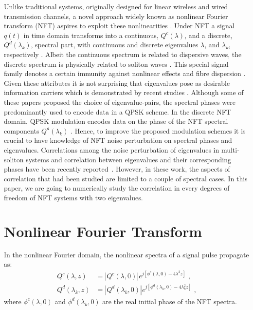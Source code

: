 \documentclass[9pt,twocolumn,twoside]{osajnl}
\begin{document}
Unlike traditional systems, originally designed for linear wireless and wired transmission channels, a novel approach widely known as nonlinear Fourier transform (NFT) aspires to exploit these nonlinearities \cite{Agrawal2006, derevyanko_capacity_2016, essiambre_capacity_2010}. Under NFT a signal $q(t)$ in time domain transforms into a continuous, $Q^c(\lambda)$, and a discrete, $Q^d(\lambda_k)$, spectral part, with continuous and discrete eigenvalues $\lambda$, and $\lambda_k$, respectively \cite{yousefi_information_2014}. Albeit the continuous spectrum is related to dispersive waves, the discrete spectrum is physically related to soliton waves \cite{yousefi_information_2014, yousefi_information_2014-1, Agrawal2006}. This special signal family denotes a certain immunity against nonlinear effects and fibre dispersion \cite{Agrawal2006, derevyanko_capacity_2016}. Given these attributes it is not surprising that eigenvalues pose as desirable information carriers which is demonstrated by recent studies \cite{bulow_experimental_2016, aref_experimental_2015, aref_demonstration_2016, gui_alternative_2017, gui_4_2017, hari_multi-eigenvalue_2014, span_time-bandwidth_2017, zhang_correlated_2019}. Although some of these papers proposed the choice of eigenvalue-pairs, the spectral phases were predominantly used to encode data in a QPSK scheme. In the discrete NFT domain, QPSK modulation encodes data on the phase of the NFT spectral components $Q^d(\lambda_k)$ \cite{bulow_experimental_2016, aref_experimental_2015, aref_demonstration_2016, gui_4_2017}. Hence, to improve the proposed modulation schemes it is crucial to have knowledge of NFT noise perturbation on spectral phases and eigenvalues. Correlations among the noise perturbation of eigenvalues in multi-soliton systems and correlation between eigenvalues and their corresponding phases have been recently reported~\cite{zhang_correlated_2019, bulow_experimental_2016}. However, in these work, the aspects of correlation that had been studied are limited to a couple of spectral cases. In this paper, we are going to numerically study the correlation in every degrees of freedom of NFT systems with two eigenvalues.

\section{Nonlinear Fourier Transform}
\label{sec:NFT}

In the nonlinear Fourier domain, the nonlinear spectra of a signal pulse propagate as:
\begin{subequations}
    \begin{align}
        Q^{c}(\lambda,z) &= |Q^{c}(\lambda,0)|e^{j[\phi^c(\lambda,0)-4\lambda^2 z]} \text{ ,}\label{eq:propagation-qc}\\
        Q^{d}(\lambda_k,z) &= |Q^{d}(\lambda_k,0)|e^{j[\phi^{d}(\lambda_k,0)-4\lambda_k^2 z]} \text{ ,}\label{eq:propagation-qd}
    \end{align}
\end{subequations}
where $\phi^c(\lambda,0)$ and $\phi^d(\lambda_k,0)$ are the real initial phase of the NFT spectra.
\end{document}
